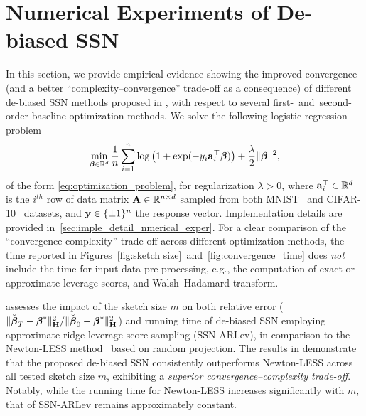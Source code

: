 \documentclass[11pt,a4paper]{article}
\begin{document}
\section{Numerical Experiments of De-biased SSN}
\label{sec:num}


In this section, we provide empirical evidence showing the improved convergence (and a better ``complexity--convergence'' trade-off as a consequence) of different de-biased SSN methods proposed in , with respect to several first-~and~second-order baseline optimization methods.
We solve the following logistic regression problem 
\begin{equation}
  \min_{\boldsymbol{\beta}\in {\mathbb{R}}^d } \frac{1}{n}\sum^n_{i=1}\log \left(1+\exp(-y_i\mathbf{a}^\top_i\boldsymbol{\beta}) \right)+\frac{\lambda}{2}\|\boldsymbol{\beta}\|^2,
\end{equation}
of the form \eqref{eq:optimization_problem}, for regularization $\lambda>0$, where $\mathbf{a}_i^\top \in {\mathbb{R}}^d$ is the $i^{th}$ row of data matrix $\mathbf{A} \in {\mathbb{R}}^{n \times d}$ sampled from both MNIST~\cite{lecun1998gradient} and CIFAR-10~\cite{krizhevsky2009Learning} datasets, and $\mathbf{y}\in\{\pm 1\}^n$ the response vector. 
Implementation details are provided in~\cref{sec:imple_detail_nmerical_exper}.
For a clear comparison of the ``convergence-complexity'' trade-off across different optimization methods, the time reported in Figures~\ref{fig:sketch size}~and~\ref{fig:convergence_time} does \emph{not} include the time for input data pre-processing, e.g.,  the computation of exact or approximate leverage scores, and Walsh–Hadamard transform.

 assesses the impact of the sketch size $m$ on both relative error ($\|\check{\boldsymbol{\beta}}_T-\boldsymbol{\beta}^{\ast}\|^2_{\mathbf{H}}/\|\check{\boldsymbol{\beta}}_0-\boldsymbol{\beta}^{\ast}\|^2_{\mathbf{H}}$) and running time of de-biased SSN employing approximate ridge leverage score sampling (SSN-ARLev), in comparison to the Newton-LESS method~\citep{derezinski2021newtonless} based on random projection.  
The results in  demonstrate that the proposed de-biased SSN consistently outperforms Newton-LESS across all tested sketch size $m$, exhibiting a \emph{superior convergence--complexity trade-off}.
Notably, while the running time for Newton-LESS increases significantly with $m$, that of SSN-ARLev remains approximately constant.
\end{document}
